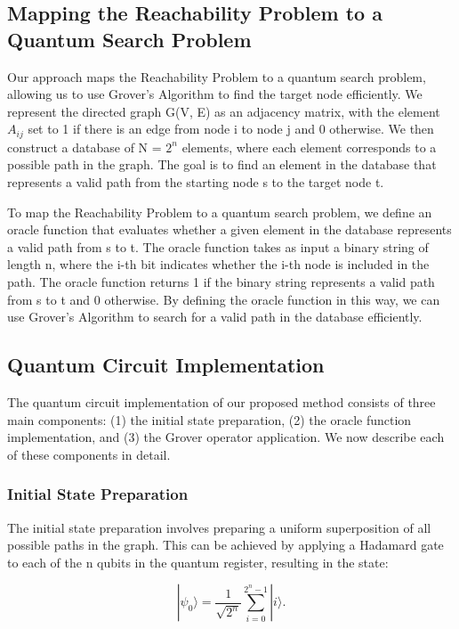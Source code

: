 \subsection{Mapping the Reachability Problem to a Quantum Search Problem}

Our approach maps the Reachability Problem to a quantum search problem, allowing us to use Grover's Algorithm to find the target node efficiently. We represent the directed graph G(V, E) as an adjacency matrix, with the element $A_{ij}$ set to 1 if there is an edge from node i to node j and 0 otherwise. We then construct a database of N = $2^n$ elements, where each element corresponds to a possible path in the graph. The goal is to find an element in the database that represents a valid path from the starting node s to the target node t.

To map the Reachability Problem to a quantum search problem, we define an oracle function that evaluates whether a given element in the database represents a valid path from s to t. The oracle function takes as input a binary string of length n, where the i-th bit indicates whether the i-th node is included in the path. The oracle function returns 1 if the binary string represents a valid path from s to t and 0 otherwise. By defining the oracle function in this way, we can use Grover's Algorithm to search for a valid path in the database efficiently.

\subsection{Quantum Circuit Implementation}

The quantum circuit implementation of our proposed method consists of three main components: (1) the initial state preparation, (2) the oracle function implementation, and (3) the Grover operator application. We now describe each of these components in detail.

\subsubsection{Initial State Preparation}

The initial state preparation involves preparing a uniform superposition of all possible paths in the graph. This can be achieved by applying a Hadamard gate to each of the n qubits in the quantum register, resulting in the state:

\begin{equation}
    |\psi_0\rangle = \frac{1}{\sqrt{2^n}} \sum_{i=0}^{2^n-1} |i\rangle.
\end{equation}


